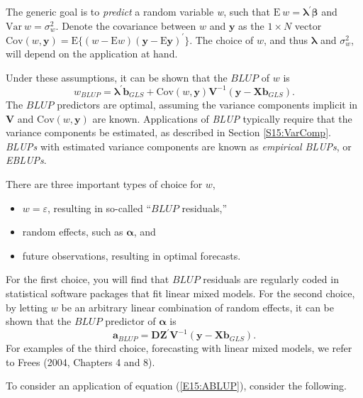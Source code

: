 The generic goal is to \emph{predict} a random variable \textit{w},
such that $\mathrm{E}~ w = \boldsymbol \lambda ^{\prime} \boldsymbol
\beta$ and $\mathrm{Var}~ w = \sigma^2_w$. Denote the covariance
between $w$ and $\mathbf{y}$ as the $1 \times N$ vector
$\mathrm{Cov}(w,\mathbf{y}) =
\mathrm{E}\{(w-\mathrm{E}w)(\mathbf{y}-\mathrm{E}\mathbf{y})^{\prime}
\}$. The choice of $w$, and thus $\boldsymbol \lambda $ and
$\sigma^2_w$, will depend on the application at hand.

Under these assumptions, it can be shown that the $BLUP$ of $w$ is
\begin{equation}\label{E15:BLUP}
w_{BLUP} = \boldsymbol \lambda ^{\prime} \mathbf{b}_{GLS} +
\mathrm{Cov}(w,\mathbf{y})\mathbf{V}^{-1}(\mathbf{y}-\mathbf{X}
\mathbf{b}_{GLS}).
\end{equation}
The $BLUP$ predictors are optimal, assuming the variance components
implicit in $\mathbf{V}$ and $\mathrm{Cov}(w,\mathbf{y})$ are known.
Applications of \emph{BLUP} typically require that the variance
components be estimated, as described in Section \ref{S15:VarComp}.
\emph{BLUPs} with estimated variance components are known as
\emph{empirical BLUPs}, or \emph{EBLUPs}.

There are three important types of choice for $w$,
\begin{itemize}
\item $w=\varepsilon$, resulting in so-called ``$BLUP$ residuals,''
\item random effects, such as $\boldsymbol \alpha$, and
\item future observations, resulting in optimal forecasts.
\end{itemize}

For the first choice, you will find that $BLUP$ residuals are
regularly coded in statistical software packages that fit linear
mixed models. For the second choice, by letting $w$ be an arbitrary
linear combination of random effects, it can be shown that the
$BLUP$ predictor of $\boldsymbol \alpha$ is
\begin{equation}\label{E15:ABLUP}
\mathbf{a}_{BLUP}  =  \mathbf{D Z}^{\prime} \mathbf{V}^{-1}
(\mathbf{y} - \mathbf{X b}_{GLS}).
\end{equation}
For examples of the third choice, forecasting with linear mixed
models, we refer to Frees (2004, Chapters 4 and 8).

To consider an application of equation (\ref{E15:ABLUP}), consider
the following.

\linejed

